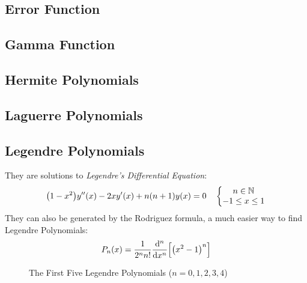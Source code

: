     \subsection{Error Function}
    \subsection{Gamma Function}
    \subsection{Hermite Polynomials}
    \subsection{Laguerre Polynomials}
    \subsection{Legendre Polynomials}
        They are solutions to \textit{Legendre's Differential Equation}:
        \begin{equation}
            \qty(1-x^2)y''(x)-2xy'(x)+n(n+1)y(x)=0\quad\left\{ \begin{gathered} \begin{matrix} n\in\mathbb{N}\\-1\leq x\leq 1 \end{matrix} \end{gathered} \right.
        \end{equation}
        They can also be generated by the Rodriguez formula, a much easier way to find Legendre Polynomials:\cite{pinsky_2011}
        \begin{equation}
            P_n(x)=\oo{2^nn!}\der[n]{x}\qty[\qty(x^2-1)^n]
        \end{equation}
        \begin{figure}[h!]
            \centering
            \caption{The First Five Legendre Polynomials ($n=0,1,2,3,4$)}
            \label{fig:legendre_graph}
        \end{figure}
%